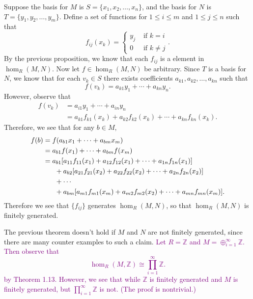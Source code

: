 \documentclass[12pt,letterpaper]{algebra_book}
\newcommand{\ZZ}{\mathbb{Z}}
\theoremstyle{definition}
\begin{document}
\begin{prf}
    Suppose the basis for $M$ is $S = \{x_1, x_2, \dots, x_n\}$,
    and the basis for $N$ is $T = \{y_1, y_2, \dots, y_m\}$.
    Define a set of functions for $1 \le i \le m$ and $1 \le j \le
    n$ such that 
    \[
        f_{ij}(x_k) = 
        \begin{cases}
            y_j & \text{ if } k = i\\
            0 & \text{ if } k \ne j
        \end{cases}.
    \]
    By the previous proposition, we know that each $f_{ij}$ is a
    element in $\hom_R(M, N)$. Now let $f \in
    \hom_R(M,N)$ be arbitrary. Since $T$ is a basis for $N$, we
    know that for each $v_k \in S$ there exists coefficients
    $a_{k1}, a_{k2}, \dots, a_{kn}$ such that  
    \[
        f(v_k) = a_{k1}y_1 + \cdots + a_{kn}y_n.
    \]
    However, observe that 
    \begin{align*}
        f(v_k) &= a_{i1}y_1 + \cdots + a_{in}y_n\\
        &= a_{k1}f_{k1}(x_k) + a_{k2}f_{k2}(x_k) + \cdots + a_{kn}f_{kn}(x_k).
    \end{align*}
    Therefore, we see that for any $b \in M$, 
    \begin{align*}
        f(b) &= f(a_{b1}x_1 + \cdots + a_{bm}x_m)\\
        &=  a_{b1}f(x_1) + \cdots + a_{bm}f(x_m)\\
        &= a_{b1}[a_{11}f_{11}(x_1) + a_{12}f_{12}(x_1) + \cdots + a_{1n}f_{1n}(x_1)]\\
        &\hspace{.6cm} + a_{b2}[a_{21}f_{21}(x_2) + a_{22}f_{22}(x_2) + \cdots + a_{2n}f_{2n}(x_2)]\\
        &\hspace{.6cm} + \cdots\\
        &\hspace{.6cm} + a_{bm}[a_{m1}f_{m1}(x_m) + a_{m2}f_{m2}(x_2) + \cdots + a_{mn}f_{mn}(x_m)].
    \end{align*}
    Therefore we see that $\{f_{ij}\}$ generates $\hom_R(M, N)$,
    so that $\hom_R(M, N)$ is finitely generated.
\end{prf}
The previous theorem doesn't hold if $M$ and $N$ are not finitely
generated, since there are many counter examples to such a
claim. 
\textcolor{purple}{
Let $R = \mathbb{Z}$ and $M = \oplus_{i =
1}^{\infty}\mathbb{Z}$. Then observe that 
\[
    \hom_R(M, \ZZ) \cong \prod_{i = 1}^{\infty}\ZZ.
\]
by Theorem 1.13. However, we see that while $\ZZ$ is finitely 
generated and $M$ is finitely generated, but $\displaystyle \prod_{i =
1}^{\infty}\ZZ$ is not. (The proof is nontrivial.)}
\end{document}
